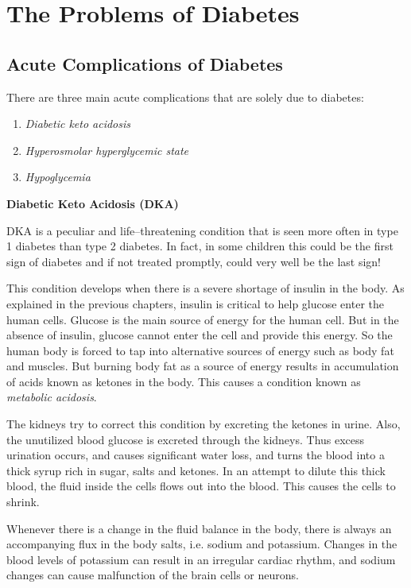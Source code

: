 
\part{The Problems of Diabetes}

\chapter{Acute Complications of Diabetes}\label{chap10}

There are three main acute complications that are solely due to diabetes:

\begin{enumerate}
\itemsep=0pt
\item \textit{Diabetic keto acidosis}
\item \textit{Hyperosmolar hyperglycemic state}
\item \textit{Hypoglycemia}
\end{enumerate}
 
\noindent\textbf{Diabetic Keto Acidosis (DKA)}

DKA is a peculiar and life–threatening condition that is seen more often in type 1 diabetes than type 2 diabetes. In fact, in some children this could be the first sign of diabetes and if not treated promptly, could very well be the last sign!

This condition develops when there is a severe shortage of insulin in the body. As explained in the previous chapters, insulin is critical to help glucose enter the human cells. Glucose is the main source of energy for the human cell. But in the absence of insulin, glucose cannot enter the cell and provide this energy. So the human body is forced to tap into alternative sources of energy such as body fat and muscles. But burning body fat as a source of energy results in accumulation of acids known as ketones in the body. This causes a condition known as \textit{metabolic acidosis}.

The kidneys try to correct this condition by excreting the ketones in urine. Also, the unutilized blood glucose is excreted through the kidneys. Thus excess urination occurs, and causes significant water loss, and turns the blood into a thick syrup rich in sugar, salts and ketones. In an attempt to dilute this thick blood, the fluid inside the cells flows out into the blood. This causes the cells to shrink.

Whenever there is a change in the fluid balance in the body, there is always an accompanying flux in the body salts, i.e. sodium and pota\-ssium. Changes in the blood levels of potassium can result in an irregu\-lar cardiac rhythm, and sodium changes can cause malfunction of the brain cells or neurons.

